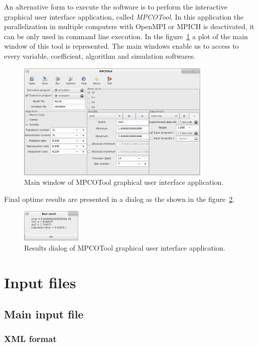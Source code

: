 \documentclass[a4paper]{report}
\begin{document}
An alternative form to execute the software is to perform the interactive
graphical user interface application, called \emph{MPCOTool}. In this
application the parallelization in multiple computers with OpenMPI or MPICH is
deactivated, it can be only used in command line execution. In the
figure~\ref{FigWindow} a plot of the main window of this tool is represented.
The main windows enable us to access to every variable, coefficient, algorithm
and simulation softwares.
\begin{figure}[ht!]
	\centering
	\includegraphics[width=9.30cm]{mpcotool-en.eps}
	\caption{Main window of MPCOTool graphical user interface application.
		\label{FigWindow}}
\end{figure}

Final optime results are presented in a dialog as the shown in the
figure~\ref{FigResult}.
\begin{figure}[ht!]
	\centering
	\includegraphics[width=2.87cm]{result-en.eps}
	\caption{Results dialog of MPCOTool graphical user interface application.
		\label{FigResult}}
\end{figure}

\section{Input files}

\subsection{Main input file}

\subsubsection{XML format}
\end{document}
